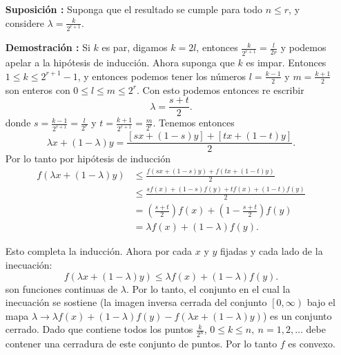 \documentclass{report}
\begin{document}
\begin{enumerate}
  \item[\textbf{Suposición :}] Suponga que el resultado se cumple para todo $n \le r$, y considere $\lambda = \frac{k}{2^{r + 1}}$.
  \item[\textbf{Demostración :}] Si $k$ es par, digamos $k = 2l$, entonces $\frac{k}{2^{r+1}} = \frac{l}{2r}$ y podemos apelar a la hipótesis de inducción. Ahora suponga que $k$ es impar. Entonces $1 \le k \le 2^{r + 1} - 1$, y entonces podemos tener los números $l = \frac{k-1}{2}$ y $m = \frac{k + 1}{2}$ son enteros con $0 \le l \le m \le 2^{r}$. Con esto podemos entonces re escribir \[
  \lambda = \frac{s + t}{2}
  .\] donde $s = \frac{k - 1}{2^{r + 1}} = \frac{l}{2^{r}}$ y $t = \frac{k + 1}{2^{r + 1}} = \frac{m}{2^{r}}$. Tenemos entonces \[
  \lambda x + \left( 1 - \lambda \right) y = \frac{\left[ sx + \left( 1 - s \right) y \right] + \left[ tx + \left( 1 - t \right) y \right] }{2}
  .\]  Por lo tanto por hipótesis de inducción 
  \begin{align*}
    f\left( \lambda x + \left( 1 - \lambda \right) y \right) &\le \frac{f\left( sx + \left( 1 - s \right) y \right) + f\left( tx + \left( 1 - t \right) y \right) }{2} \\
							     &\le \frac{sf\left( x \right) + \left( 1 - s \right) f\left( y \right) + tf\left( x \right) + \left( 1 - t \right) f\left( y \right) }{2}\\
							     &= \left( \frac{s + t}{2} \right) f\left( x \right)  + \left( 1 - \frac{s + t}{2} \right) f\left( y \right) \\
							     &= \lambda f\left( x \right) + \left( 1 - \lambda \right) f\left( y \right) 
  .\end{align*}

  Esto completa la inducción.
  Ahora por cada $x$ y $y$ fijadas  y cada lado de la inecuación: \[
  f\left( \lambda x + \left( 1 - \lambda \right) y \right) \le \lambda f\left( x \right) + \left( 1 - \lambda \right) f\left( y \right) 
  .\] son funciones continuas de $\lambda$. Por lo tanto,  el conjunto en el cual la inecuación se sostiene (la imagen inversa cerrada del conjunto $\left[ 0, \infty \right) $ bajo el mapa $\lambda \to \lambda f\left( x \right) + \left( 1 - \lambda \right) f\left( y \right) - f\left( \lambda x + \left( 1 - \lambda \right) y\right) $) es un conjunto cerrado. Dado que contiene todos los puntos $\frac{k}{2^{n}}$, $0 \le k \le n,\ n = 1,2,\ldots$ debe contener una cerradura de este conjunto de puntos. Por lo tanto $f$ es convexo.
\end{enumerate}
\end{document}
